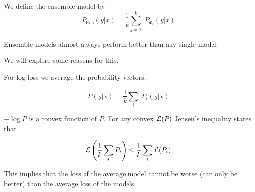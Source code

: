 {\vfill
We define the ensemble model by
$$P_\mathrm{Ens}(y|x) = \frac{1}{k} \sum_{j=1}^k\; P_{\Phi_i}(y|x)$$

\vfill
Ensemble models almost always perform better than any single model.

\vfill
We will explore some reasons for this.


\vfill
{}

For log loss we average the probability vectors.

\vfill
$$P(y|x) = \frac{1}{k} \sum_i \;P_i(y|x)$$

\vfill
$- \log P$ is a convex function of $P$.  For any convex ${\cal L}(P)$ Jensen's inequality states that

$${\cal L}\left(\frac{1}{k} \sum_i P_i\right) \leq \frac{1}{k} \sum_i {\cal L}(P_i)$$

\vfill
This implies that the loss of the average model cannot be worse (can only be better) than the average loss of the models.


}
